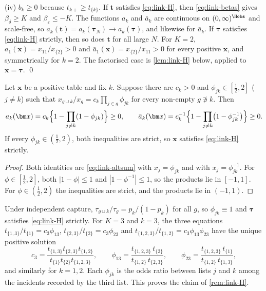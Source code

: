 (iv) $b_k\ge0$ because $t_{k+}\ge t_{\{k\}}$. If $\bm t$ satisfies \eqref{eq:link-H}, then \eqref{eq:link-betas} gives $\beta_\delta\ge K$ and $\beta_\varepsilon\le-K$. The functions $a_k$ and $\bar a_k$ are continuous on $(0,\infty)^{\Hobs}$ and scale-free, so $a_k(\bm t)=a_k(\bm\tau_N)\to a_k(\bm\tau)$, and likewise for $\bar a_k$. If $\bm\tau$ satisfies \eqref{eq:link-H} strictly, then so does $\bm t$ for all large $N$. For $K=2$, $a_1(\bm x)=x_{11}/x_{\{2\}}>0$ and $\bar a_1(\bm x)=x_{\{2\}}/x_{11}>0$ for every positive $\bm x$, and symmetrically for $k=2$. The factorised case is \cref{lem:link-H} below, applied to $\bm x=\bm\tau$. \qed

\begin{lemma}\label{lem:link-H}
Let $\bm x$ be a positive table and fix $k$. Suppose there are $c_k>0$ and $\phi_{jk}\in[\frac12,2]$ ($j\ne k$) such that $x_{g\cup k}/x_g=c_k\prod_{j\in g}\phi_{jk}$ for every non-empty $g\not\ni k$. Then
\[
  a_k(\bm x)=c_k\Bigl\{1-\prod_{j\ne k}(1-\phi_{jk})\Bigr\}\ge0,
  \qquad
  \bar a_k(\bm x)=c_k^{-1}\Bigl\{1-\prod_{j\ne k}\bigl(1-\phi_{jk}^{-1}\bigr)\Bigr\}\ge0 .
\]
If every $\phi_{jk}\in(\frac12,2)$, both inequalities are strict, so $\bm x$ satisfies \eqref{eq:link-H} strictly.
\end{lemma}

\begin{proof}
Both identities are \eqref{eq:link-altsum} with $x_j=\phi_{jk}$ and with $x_j=\phi_{jk}^{-1}$. For $\phi\in[\frac12,2]$, both $|1-\phi|\le1$ and $|1-\phi^{-1}|\le1$, so the products lie in $[-1,1]$. For $\phi\in(\frac12,2)$ the inequalities are strict, and the products lie in $(-1,1)$.
\end{proof}

Under independent capture, $\tau_{g\cup k}/\tau_g=p_k/(1-p_k)$ for all $g$, so $\phi_{jk}\equiv1$ and $\bm\tau$ satisfies \eqref{eq:link-H} strictly. For $K=3$ and $k=3$, the three equations $t_{\{1,3\}}/t_{\{1\}}=c_3\phi_{13}$, $t_{\{2,3\}}/t_{\{2\}}=c_3\phi_{23}$ and $t_{\{1,2,3\}}/t_{\{1,2\}}=c_3\phi_{13}\phi_{23}$ have the unique positive solution
\[
  c_3=\frac{t_{\{1,3\}}t_{\{2,3\}}t_{\{1,2\}}}{t_{\{1\}}t_{\{2\}}t_{\{1,2,3\}}},\qquad
  \phi_{13}=\frac{t_{\{1,2,3\}}\,t_{\{2\}}}{t_{\{1,2\}}\,t_{\{2,3\}}},\qquad
  \phi_{23}=\frac{t_{\{1,2,3\}}\,t_{\{1\}}}{t_{\{1,2\}}\,t_{\{1,3\}}},
\]
and similarly for $k=1,2$. Each $\phi_{jk}$ is the odds ratio between lists $j$ and $k$ among the incidents recorded by the third list. This proves the claim of \cref{rem:link-H}.

